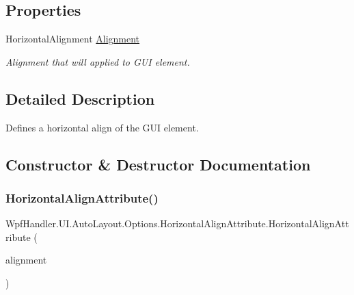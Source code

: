 \subsection*{Properties}
\begin{DoxyCompactItemize}
\item 
Horizontal\+Alignment \mbox{\hyperlink{class_wpf_handler_1_1_u_i_1_1_auto_layout_1_1_options_1_1_horizontal_align_attribute_a7e62bc68b5e19d0f8167a97146996b6c}{Alignment}}
\begin{DoxyCompactList}\small\item\em Alignment that will applied to G\+UI element. \end{DoxyCompactList}\end{DoxyCompactItemize}


\subsection{Detailed Description}
Defines a horizontal align of the G\+UI element. 



\subsection{Constructor \& Destructor Documentation}
\mbox{\label{class_wpf_handler_1_1_u_i_1_1_auto_layout_1_1_options_1_1_horizontal_align_attribute_a68f618bca2478665511748571b254dd0}} 
\subsubsection{\texorpdfstring{Horizontal\+Align\+Attribute()}{HorizontalAlignAttribute()}}
{\footnotesize\ttfamily Wpf\+Handler.\+U\+I.\+Auto\+Layout.\+Options.\+Horizontal\+Align\+Attribute.\+Horizontal\+Align\+Attribute (\begin{DoxyParamCaption}\item[{Horizontal\+Alignment}]{alignment }\end{DoxyParamCaption})}



